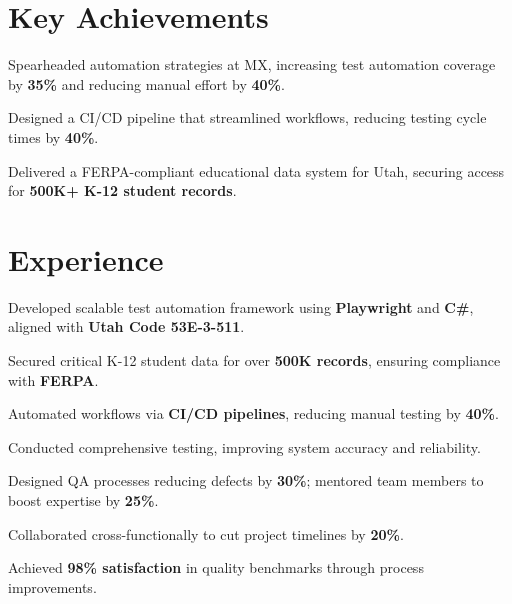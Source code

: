 \documentclass[hmargin=1.5cm, vmargin=1.5cm, scale=0.94]{deedy-resume-openfont}
\begin{document}
\begin{minipage}[t]{0.66\textwidth}

\section{Key Achievements}
\begin{tightemize}
\item Spearheaded automation strategies at MX, increasing test automation coverage by \textbf{35\%} and reducing manual effort by \textbf{40\%}.
\item Designed a CI/CD pipeline that streamlined workflows, reducing testing cycle times by \textbf{40\%}.
\item Delivered a FERPA-compliant educational data system for Utah, securing access for \textbf{500K+ K-12 student records}.
\end{tightemize}
\sectionsep

\section{Experience}

\begin{tightemize}
\item Developed scalable test automation framework using \textbf{Playwright} and \textbf{C\#}, aligned with \textbf{Utah Code 53E-3-511}.
\item Secured critical K-12 student data for over \textbf{500K records}, ensuring compliance with \textbf{FERPA}.
\item Automated workflows via \textbf{CI/CD pipelines}, reducing manual testing by \textbf{40\%}.
\item Conducted comprehensive testing, improving system accuracy and reliability.
\end{tightemize}

\begin{tightemize}
\item Designed QA processes reducing defects by \textbf{30\%}; mentored team members to boost expertise by \textbf{25\%}.
\item Collaborated cross-functionally to cut project timelines by \textbf{20\%}.
\item Achieved \textbf{98\% satisfaction} in quality benchmarks through process improvements.
\end{tightemize}


\end{minipage}
\end{document}
